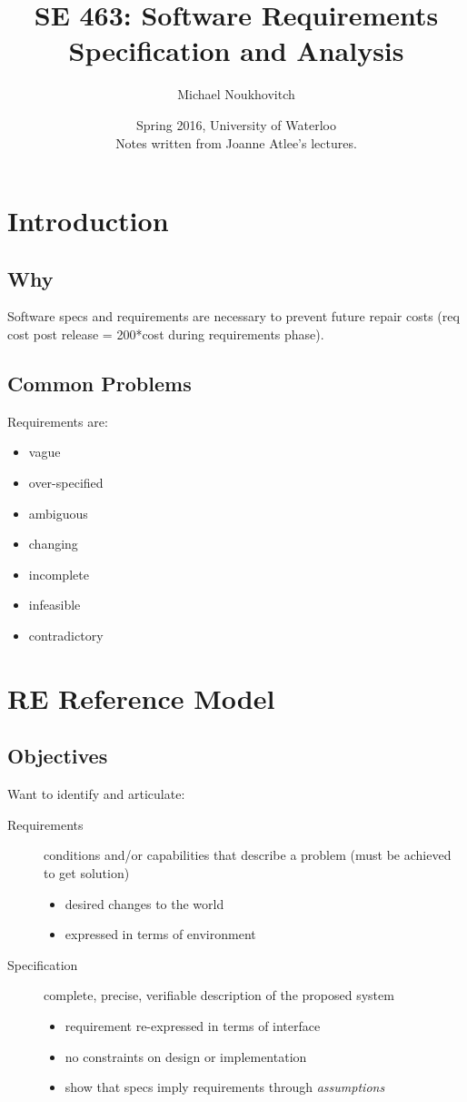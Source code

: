 \documentclass[]{article}
\theoremstyle{definition}
\begin{document}
	\let\ref\Cref

	\title{\bf{SE 463: Software Requirements Specification and Analysis}}
	\date{Spring 2016, University of Waterloo \\ \center Notes written from Joanne Atlee's lectures.}
	\author{Michael Noukhovitch}

	\maketitle
	\newpage
	\tableofcontents
	\newpage

	\section{Introduction}
	\subsection{Why}
	Software specs and requirements are necessary to prevent future repair costs (req cost post release = 200*cost during requirements phase).
	\subsection{Common Problems}
	Requirements are:
	\begin{itemize}
		\item vague 
		\item over-specified
		\item ambiguous
		\item changing
		\item incomplete
		\item infeasible
		\item contradictory
	\end{itemize}

	\section{RE Reference Model}
	\subsection{Objectives}
	Want to identify and articulate:
	\begin{description}
		\item[Requirements] conditions and/or capabilities that describe a problem (must be achieved to get solution)
			\begin{itemize}
				\item desired changes to the world
				\item expressed in terms of environment
			\end{itemize}
		\item[Specification] complete, precise, verifiable description of the proposed system
			\begin{itemize}
				\item requirement re-expressed in terms of interface
				\item no constraints on design or implementation
				\item show that specs imply requirements through \textit{assumptions}
			\end{itemize}
	\end{description}
\end{document}
